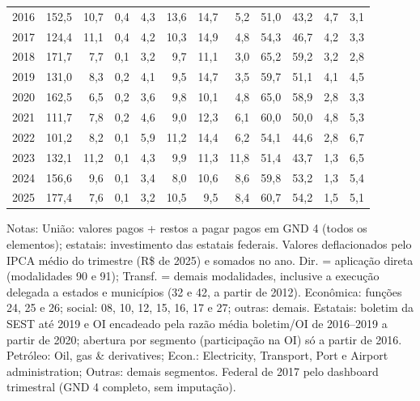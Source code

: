 \begin{table}[htbp]
\begin{tabular}{lrrrrrrrrrrr}
2016 & 152{,}5 & 10{,}7 & 0{,}4 & 4{,}3 & 13{,}6 & 14{,}7 & 5{,}2 & 51{,}0 & 43{,}2 & 4{,}7 & 3{,}1 \\
2017 & 124{,}4 & 11{,}1 & 0{,}4 & 4{,}2 & 10{,}3 & 14{,}9 & 4{,}8 & 54{,}3 & 46{,}7 & 4{,}2 & 3{,}3 \\
2018 & 171{,}7 & 7{,}7 & 0{,}1 & 3{,}2 & 9{,}7 & 11{,}1 & 3{,}0 & 65{,}2 & 59{,}2 & 3{,}2 & 2{,}8 \\
2019 & 131{,}0 & 8{,}3 & 0{,}2 & 4{,}1 & 9{,}5 & 14{,}7 & 3{,}5 & 59{,}7 & 51{,}1 & 4{,}1 & 4{,}5 \\
2020 & 162{,}5 & 6{,}5 & 0{,}2 & 3{,}6 & 9{,}8 & 10{,}1 & 4{,}8 & 65{,}0 & 58{,}9 & 2{,}8 & 3{,}3 \\
2021 & 111{,}7 & 7{,}8 & 0{,}2 & 4{,}6 & 9{,}0 & 12{,}3 & 6{,}1 & 60{,}0 & 50{,}0 & 4{,}8 & 5{,}3 \\
2022 & 101{,}2 & 8{,}2 & 0{,}1 & 5{,}9 & 11{,}2 & 14{,}4 & 6{,}2 & 54{,}1 & 44{,}6 & 2{,}8 & 6{,}7 \\
2023 & 132{,}1 & 11{,}2 & 0{,}1 & 4{,}3 & 9{,}9 & 11{,}3 & 11{,}8 & 51{,}4 & 43{,}7 & 1{,}3 & 6{,}5 \\
2024 & 156{,}6 & 9{,}6 & 0{,}1 & 3{,}4 & 8{,}0 & 10{,}6 & 8{,}6 & 59{,}8 & 53{,}2 & 1{,}3 & 5{,}4 \\
2025 & 177{,}4 & 7{,}6 & 0{,}1 & 3{,}2 & 10{,}5 & 9{,}5 & 8{,}4 & 60{,}7 & 54{,}2 & 1{,}5 & 5{,}1 \\
\bottomrule
\end{tabular}
\begin{minipage}{0.95\linewidth}\footnotesize
\medskip Notas: Uni\~ao: valores pagos + restos a pagar pagos em GND 4 (todos os elementos); estatais: investimento das estatais federais. Valores deflacionados pelo IPCA m\'edio do trimestre (R\$ de 2025) e somados no ano. Dir. = aplica\c{c}\~ao direta (modalidades 90 e 91); Transf. = demais modalidades, inclusive a execu\c{c}\~ao delegada a estados e munic\'ipios (32 e 42, a partir de 2012). Econ\^omica: fun\c{c}\~oes 24, 25 e 26; social: 08, 10, 12, 15, 16, 17 e 27; outras: demais. Estatais: boletim da SEST at\'e 2019 e OI encadeado pela raz\~ao m\'edia boletim/OI de 2016--2019 a partir de 2020; abertura por segmento (participa\c{c}\~ao na OI) s\'o a partir de 2016. Petr\'oleo: Oil, gas \& derivatives; Econ.: Electricity, Transport, Port e Airport administration; Outras: demais segmentos. Federal de 2017 pelo dashboard trimestral (GND 4 completo, sem imputa\c{c}\~ao).
\end{minipage}
\end{table}
